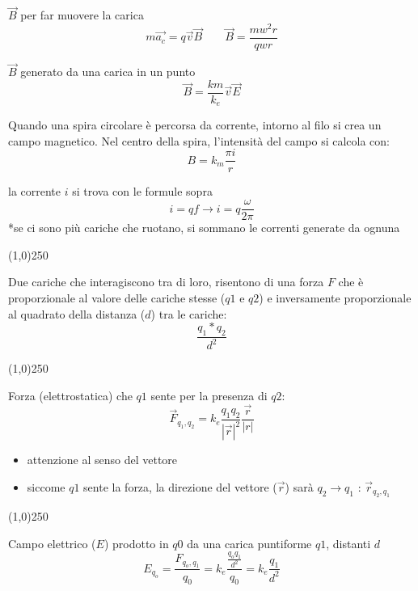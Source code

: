 \documentclass[14pt]{extarticle}
\begin{document}
$\overrightarrow{B}$ per far muovere la carica
\begin{equation*}
    m\overrightarrow{a_c}=q\overrightarrow{v}\overrightarrow{B}
    \quad\quad
    \overrightarrow{B}=\frac{mw^2r}{qwr}
\end{equation*}

$\overrightarrow{B}$ generato da una carica in un punto
\begin{equation*}
    \overrightarrow{B}=\frac{km}{k_e}\overrightarrow{v}\overrightarrow{E}
\end{equation*}

Quando una spira circolare è percorsa da corrente, intorno al filo si crea 
un campo magnetico. Nel centro della spira, l'intensità del campo si calcola con:
\begin{equation*}
    B=k_m\frac{\pi i}{r}
\end{equation*}

la corrente $i$ si trova con le formule sopra
\begin{equation*}
    i = qf \rightarrow i=q\frac{\omega}{2\pi}
\end{equation*}
*se ci sono più cariche che ruotano, si sommano le correnti generate da ognuna
\begin{center}
    \line(1,0){250}
\end{center}

Due cariche che interagiscono tra di loro, risentono di una forza $F$ che è proporzionale al valore delle cariche stesse ($q1$ e $q2$) e inversamente proporzionale al quadrato della distanza ($d$) tra le cariche:
\begin{equation*}
    \frac{q_1*q_2}{d^2}
\end{equation*}
\begin{center}
    \line(1,0){250}
\end{center}
Forza (elettrostatica) che $q1$ sente per la presenza di $q2$:
\begin{equation*}
    \overrightarrow{F}_{q_1,q_2}=k_e\frac{q_1q_2}{|\overrightarrow{r}|^2}\frac{\overrightarrow{r}}{|r|}
\end{equation*}
\begin{itemize}
    \item attenzione al senso del vettore
    \item siccome $q1$ sente la forza, la direzione del vettore ($\overrightarrow{r}$) sarà $q_2\rightarrow q_1$ : $\overrightarrow{r}_{q_2,q_1}$
\end{itemize}


\begin{center}
    \line(1,0){250}
\end{center}
Campo elettrico ($E$) prodotto in $q0$ da una carica puntiforme $q1$, distanti $d$
\begin{equation*}
    E_{q_o}=\frac{F_{q_o,q_1}}{q_0}=k_e\frac{\frac{q_oq_1}{d^2}}{q_0}=k_e\frac{q_1}{d^2}
\end{equation*}
\end{document}
